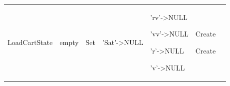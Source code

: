 \begin{center}
\tablehead{
}
\tabletail{
}
\tablelasttail{\hline}
\begin{supertabular}{|p{0.9in}|p{0.7in}|p{0.7in}|p{0.75in}|p{0.75in}|p{0.8in}|p{0.7in}|}
\hline
\begin{small}LoadCartState\end{small} &
\begin{small}empty\end{small} &
\begin{small}Set\end{small} &
\begin{small}'Sat'->NULL\end{small} &
\begin{small}'rv'->NULL

'vv'->NULL

'r'->NULL

'v'->NULL\end{small} &
\begin{small}Create

Create


\end{small}
\end{supertabular}
\end{center}

